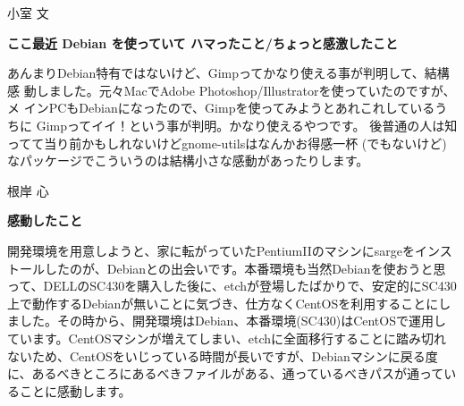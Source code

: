 \documentclass[cjk,dvipdfmx,12pt]{beamer}
\newenvironment{commandline}%
{\VerbatimEnvironment
  \begin{Sbox}\begin{minipage}{0.9\hsize}\begin{fontsize}{7.3}{7.3} \begin{BVerbatim}}%
{\end{BVerbatim}\end{fontsize}\end{minipage}\end{Sbox}
  \setlength{\fboxsep}{8pt}

\vspace{6pt}%
\fcolorbox{dancerdarkblue}{dancerlightblue}{\TheSbox}

\vspace{6pt}%
}
\begin{document}
\begin{frame}{小室 文}

\textbf{ここ最近 Debian を使っていて ハマったこと/ちょっと感激したこと}

あんまりDebian特有ではないけど、Gimpってかなり使える事が判明して、結構感
動しました。元々MacでAdobe Photoshop/Illustratorを使っていたのですが、メ
インPCもDebianになったので、Gimpを使ってみようとあれこれしているうちに
Gimpってイイ！という事が判明。かなり使えるやつです。
後普通の人は知ってて当り前かもしれないけどgnome-utilsはなんかお得感一杯
(でもないけど)なパッケージでこういうのは結構小さな感動があったりします。

\end{frame}\begin{frame}{根岸 心}

\textbf{感動したこと}

開発環境を用意しようと、家に転がっていたPentiumIIのマシンにsargeをインストールしたのが、Debianとの出会いです。本番環境も当然Debianを使おうと思って、DELLのSC430を購入した後に、etchが登場したばかりで、安定的にSC430上で動作するDebianが無いことに気づき、仕方なくCentOSを利用することにしました。その時から、開発環境はDebian、本番環境(SC430)はCentOSで運用しています。CentOSマシンが増えてしまい、etchに全面移行することに踏み切れないため、CentOSをいじっている時間が長いですが、Debianマシンに戻る度に、あるべきところにあるべきファイルがある、通っているべきパスが通っていることに感動します。


\end{frame}
\end{document}
